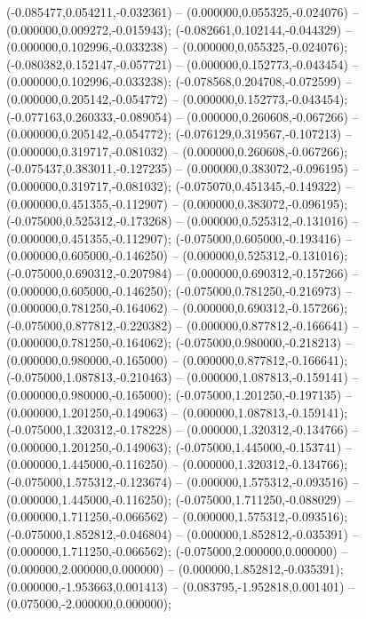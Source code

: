  (-0.085477,0.054211,-0.032361) -- (0.000000,0.055325,-0.024076) -- (0.000000,0.009272,-0.015943);
 (-0.082661,0.102144,-0.044329) -- (0.000000,0.102996,-0.033238) -- (0.000000,0.055325,-0.024076);
 (-0.080382,0.152147,-0.057721) -- (0.000000,0.152773,-0.043454) -- (0.000000,0.102996,-0.033238);
 (-0.078568,0.204708,-0.072599) -- (0.000000,0.205142,-0.054772) -- (0.000000,0.152773,-0.043454);
 (-0.077163,0.260333,-0.089054) -- (0.000000,0.260608,-0.067266) -- (0.000000,0.205142,-0.054772);
 (-0.076129,0.319567,-0.107213) -- (0.000000,0.319717,-0.081032) -- (0.000000,0.260608,-0.067266);
 (-0.075437,0.383011,-0.127235) -- (0.000000,0.383072,-0.096195) -- (0.000000,0.319717,-0.081032);
 (-0.075070,0.451345,-0.149322) -- (0.000000,0.451355,-0.112907) -- (0.000000,0.383072,-0.096195);
 (-0.075000,0.525312,-0.173268) -- (0.000000,0.525312,-0.131016) -- (0.000000,0.451355,-0.112907);
 (-0.075000,0.605000,-0.193416) -- (0.000000,0.605000,-0.146250) -- (0.000000,0.525312,-0.131016);
 (-0.075000,0.690312,-0.207984) -- (0.000000,0.690312,-0.157266) -- (0.000000,0.605000,-0.146250);
 (-0.075000,0.781250,-0.216973) -- (0.000000,0.781250,-0.164062) -- (0.000000,0.690312,-0.157266);
 (-0.075000,0.877812,-0.220382) -- (0.000000,0.877812,-0.166641) -- (0.000000,0.781250,-0.164062);
 (-0.075000,0.980000,-0.218213) -- (0.000000,0.980000,-0.165000) -- (0.000000,0.877812,-0.166641);
 (-0.075000,1.087813,-0.210463) -- (0.000000,1.087813,-0.159141) -- (0.000000,0.980000,-0.165000);
 (-0.075000,1.201250,-0.197135) -- (0.000000,1.201250,-0.149063) -- (0.000000,1.087813,-0.159141);
 (-0.075000,1.320312,-0.178228) -- (0.000000,1.320312,-0.134766) -- (0.000000,1.201250,-0.149063);
 (-0.075000,1.445000,-0.153741) -- (0.000000,1.445000,-0.116250) -- (0.000000,1.320312,-0.134766);
 (-0.075000,1.575312,-0.123674) -- (0.000000,1.575312,-0.093516) -- (0.000000,1.445000,-0.116250);
 (-0.075000,1.711250,-0.088029) -- (0.000000,1.711250,-0.066562) -- (0.000000,1.575312,-0.093516);
 (-0.075000,1.852812,-0.046804) -- (0.000000,1.852812,-0.035391) -- (0.000000,1.711250,-0.066562);
 (-0.075000,2.000000,0.000000) -- (0.000000,2.000000,0.000000) -- (0.000000,1.852812,-0.035391);
 (0.000000,-1.953663,0.001413) -- (0.083795,-1.952818,0.001401) -- (0.075000,-2.000000,0.000000);
